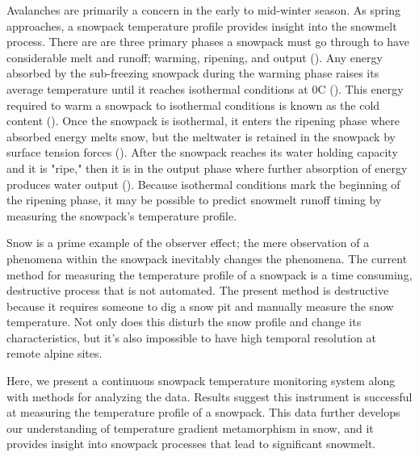 Avalanches are primarily a concern in the early to mid-winter season. As spring approaches, a snowpack temperature profile provides insight into the snowmelt process. There are are three primary phases a snowpack must go through to have considerable melt and runoff; warming, ripening, and output (\cite{dingman2015}). Any energy absorbed by the sub-freezing snowpack during the warming phase raises its average temperature until it reaches isothermal conditions at 0\textdegree C (\cite{dingman2015}). This energy required to warm a snowpack to isothermal conditions is known as the cold content (\cite{dingman2015}). Once the snowpack is isothermal, it enters the ripening phase where absorbed energy melts snow, but the meltwater is retained in the snowpack by surface tension forces (\cite{dingman2015}). After the snowpack reaches its water holding capacity and it is "ripe," then it is in the output phase where further absorption of energy produces water output (\cite{dingman2015}). Because isothermal conditions mark the beginning of the ripening phase, it may be possible to predict snowmelt runoff timing by measuring the snowpack's temperature profile.

Snow is a prime example of the observer effect; the mere observation of a phenomena within the snowpack inevitably changes the phenomena. The current method for measuring the temperature profile of a snowpack is a time consuming, destructive process that is not automated. The present method is destructive because it requires someone to dig a snow pit and manually measure the snow temperature. Not only does this disturb the snow profile and change its characteristics, but it’s also impossible to have high temporal resolution at remote alpine sites.

Here, we present a continuous snowpack temperature monitoring system along with methods for analyzing the data. Results suggest this instrument is successful at measuring the temperature profile of a snowpack. This data further develops our understanding of temperature gradient metamorphism in snow, and it provides insight into snowpack processes that lead to significant snowmelt.

